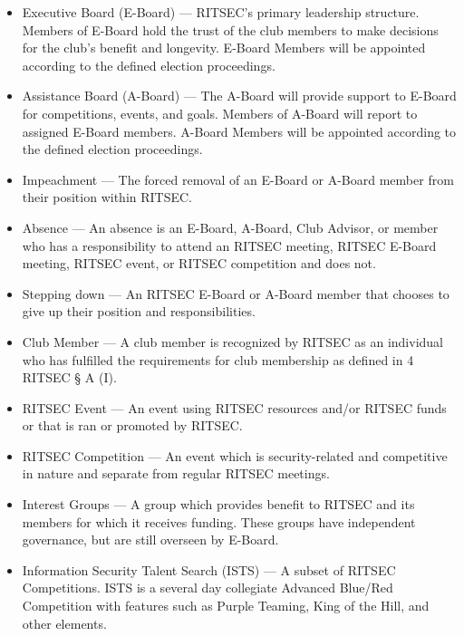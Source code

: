 \begin{itemize}
      \item Executive Board (E-Board) --- RITSEC's primary leadership structure. Members of
            E-Board hold the trust of the club members to make decisions for the club's
            benefit and longevity. E-Board Members will be appointed according to the
            defined election proceedings.

      \item Assistance Board (A-Board) --- The A-Board will provide support to E-Board for
            competitions, events, and goals. Members of A-Board will report to assigned
            E-Board members. A-Board Members will be appointed according to the defined
            election proceedings.

      \item Impeachment --- The forced removal of an E-Board or A-Board member from their
            position within RITSEC\@.

      \item Absence --- An absence is an E-Board, A-Board, Club Advisor, or member who has
            a responsibility to attend an RITSEC meeting, RITSEC E-Board meeting, RITSEC
            event, or RITSEC competition and does not.

      \item Stepping down --- An RITSEC E-Board or A-Board member that chooses to give up
            their position and responsibilities.

      \item Club Member --- A club member is recognized by RITSEC as an individual who has
            fulfilled the requirements for club membership as defined in 4 RITSEC § A (I).

      \item RITSEC Event --- An event using RITSEC resources and/or RITSEC funds or that is
            ran or promoted by RITSEC\@.

      \item RITSEC Competition --- An event which is security-related and competitive in
            nature and separate from regular RITSEC meetings.

      \item Interest Groups --- A group which provides benefit to RITSEC and its members
            for which it receives funding. These groups have independent governance, but
            are still overseen by E-Board.

      \item Information Security Talent Search (ISTS) --- A subset of RITSEC Competitions.
            ISTS is a several day collegiate Advanced Blue/Red Competition with features
            such as Purple Teaming, King of the Hill, and other elements.


\end{itemize}
